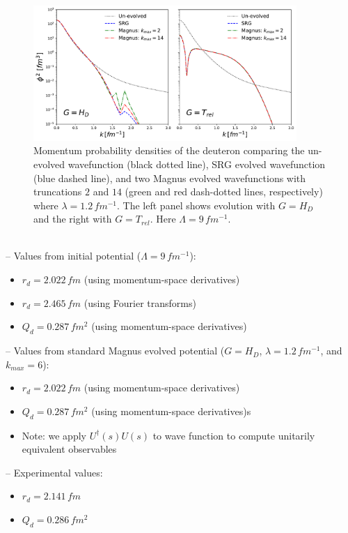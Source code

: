 \documentclass[preprintnumbers,floatfix,aps,prc,preprint,nofootinbib]{revtex4-1}
\begin{document}
\noindent{\textcolor{red}{UPDATED UP TO HERE 04/03/19}}
\\
\begin{figure}
  \captionsetup{singlelinecheck=false,justification=raggedright}
  \centering
  \includegraphics[width=10cm]{momentum_dist_Wendt_Lamb9}
  \hspace*{0.05\textwidth}
  \caption{Momentum probability densities of the deuteron comparing the un-evolved wavefunction (black dotted line), SRG evolved wavefunction (blue dashed line), and two Magnus evolved wavefunctions with truncations $2$ and $14$ (green and red dash-dotted lines, respectively) where $\lambda=1.2 \, fm^{-1}$. The left panel shows evolution with $G=H_{D}$ and the right with $G=T_{rel}$. Here $\Lambda=9 \, fm^{-1}$.}
  \label{fig:momentum_dist_Wendt_Lamb9}
\end{figure}
%
\\
-- Values from initial potential ($\Lambda=9 \, fm^{-1}$):
\begin{itemize}
  \item $r_d = 2.022 \, fm$ (using momentum-space derivatives)
  \item $r_d = 2.465 \, fm$ (using Fourier transforms)
  \item $Q_d = 0.287 \, fm^2$ (using momentum-space derivatives)
\end{itemize}
-- Values from standard Magnus evolved potential ($G=H_D$, $\lambda=1.2 \, fm^{-1}$, and $k_{max}=6$):
\begin{itemize}
  \item $r_d = 2.022 \, fm$ (using momentum-space derivatives)
  \item $Q_d = 0.287 \, fm^2$ (using momentum-space derivatives)s
  \item Note: we apply $U^{\dagger}(s) U(s)$ to wave function to compute unitarily equivalent observables
\end{itemize}
-- Experimental values:
\begin{itemize}
  \item $r_d = 2.141 \, fm$
  \item $Q_d = 0.286 \, fm^2$
\end{itemize}
\end{document}
